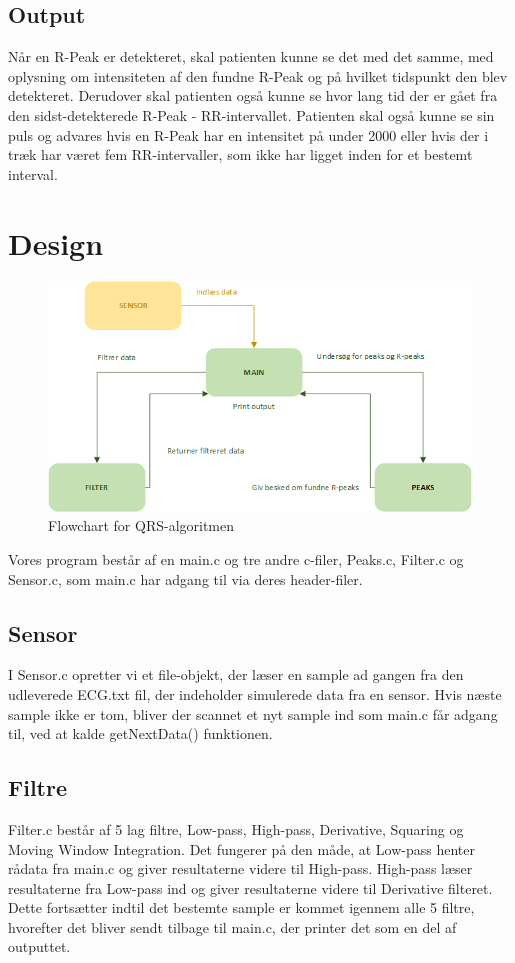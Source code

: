 \documentclass{article}
\begin{document}
\subsection{Output}
Når en R-Peak er detekteret, skal patienten kunne se det med det samme, med oplysning om intensiteten af den fundne R-Peak og på hvilket tidspunkt den blev detekteret. Derudover skal patienten også kunne se hvor lang tid der er gået fra den sidst-detekterede R-Peak - RR-intervallet. Patienten skal også kunne se sin puls og advares hvis en R-Peak har en intensitet på under 2000 eller hvis der i træk har været fem RR-intervaller, som ikke har ligget inden for et bestemt interval.

\section{Design}
\begin{figure}[h]
	\centering
	\includegraphics[scale=0.7]{diagram.png}
	\caption{Flowchart for QRS-algoritmen}
\end{figure}

Vores program består af en main.c og tre andre c-filer, Peaks.c, Filter.c og Sensor.c, som main.c har adgang til via deres header-filer. 

\subsection{Sensor}
I Sensor.c opretter vi et file-objekt, der læser en sample ad gangen fra den udleverede ECG.txt fil, der indeholder simulerede data fra en sensor. Hvis næste sample ikke er tom, bliver der scannet et nyt sample ind som main.c får adgang til, ved at kalde getNextData() funktionen.

\subsection{Filtre}
Filter.c består af 5 lag filtre, Low-pass, High-pass, Derivative, Squaring og Moving Window Integration. Det fungerer på den måde, at Low-pass henter rådata fra main.c og giver resultaterne videre til High-pass. High-pass læser resultaterne fra Low-pass ind og giver resultaterne videre til Derivative filteret. Dette fortsætter indtil det bestemte sample er kommet igennem alle 5 filtre, hvorefter det bliver sendt tilbage til main.c, der printer det som en del af outputtet.
\end{document}
